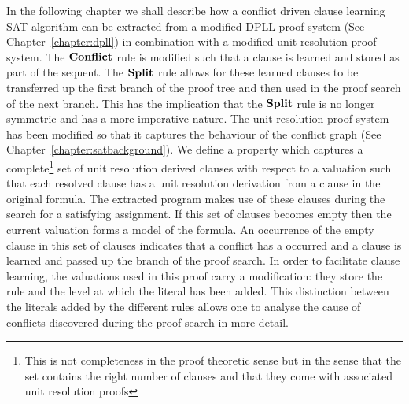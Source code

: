\newcommand{\lit}[1]{\mathrm{Lit}(#1)}
\newcommand{\first}[1]{\mathrm{First}(#1)}
\newcommand{\second}[1]{\mathrm{Second}(#1)}
\newcommand{\extends}[2]{\mathrm{extends(#1,#2)}}
\newcommand{\UnitSub}{\dpllrule{UnitSub}}
\newcommand{\SplitSub}{\dpllrule{SplitSub}}
\newcommand{\complete}[3]{\mathrm{complete}(#1;#2; #3)}
\newcommand{\DeltaVec}{\overrightarrow{\Delta}}
\newcommand{\unitdec}[2]{(U \, #1 \, #2)}
\newcommand{\unitdecg}[1]{\unitdec{#1}{\delta(\Gamma)}}
\newcommand{\unitdecgone}[1]{\unitdec{#1}{\delta(\Gamma) + 1}}
\newcommand{\splitdec}[2]{(S \, #1 \, #2)}
\newcommand{\splitdecg}[1]{\splitdec{#1}{\delta(\Gamma)}}
\newcommand{\splitdecgone}[1]{\splitdec{#1}{\delta(\Gamma) + 1}}
\newcommand{\clmodres}[2]{\overset{#1;#2}{\underset{URes}{\vdash}}}


 \label{chapter:cdclproof}
In the following chapter we shall describe how a conflict driven clause learning SAT algorithm can be extracted from a modified DPLL proof system (See Chapter~\ref{chapter:dpll}) in combination with a modified unit resolution proof system. The $\mathbf{Conflict}$ rule is modified such that a clause is learned and stored as part of the sequent. The $\mathbf{Split}$ rule allows for these learned clauses to be transferred up the first branch of the proof tree and then used in the proof search of the next branch. This has the implication that the $\mathbf{Split}$ rule is no longer symmetric and has a more imperative nature. The unit resolution proof system has been modified so that it captures the behaviour  of the conflict graph (See Chapter~\ref{chapter:satbackground}). We define a property which captures a complete\footnote{This is not completeness in the proof theoretic sense but in the sense that the set contains the right number of clauses  and that they come with associated unit resolution proofs} set of unit resolution derived clauses with respect to a valuation such that each resolved clause has a unit resolution derivation from a clause in the original formula. The extracted program makes use of these clauses during the search for a satisfying assignment. If this set of clauses becomes empty then the current valuation forms a model of the formula. An occurrence of the empty clause in this set of clauses indicates that a conflict has a occurred and a clause is learned and passed up the branch of the proof search. In order to facilitate clause learning, the valuations used in this proof carry a modification: they store the rule and the level at which the literal has been added. This distinction between the literals added by the different rules allows one to analyse the cause of conflicts discovered during the proof search in more detail.


